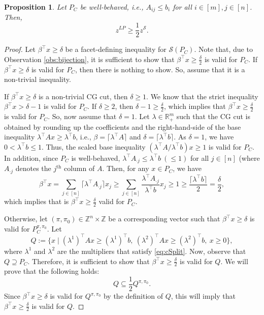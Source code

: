 \documentclass[11pt]{article}
\newcommand{\Z}{\mathbb{Z}}
\newcommand{\R}{\mathbb{R}}
\renewcommand{\S}{\mathcal{S}}
\newcommand{\ceil}[1]{\lceil#1\rceil}
\newcommand{\bpar}{\beta}
\newtheorem{proposition}{Proposition}
\newcommand{\cred}{\color{black}}
\begin{document}
\begin{proposition}
\label{prop:covering2approx}
Let $P_C$ be well-behaved, i.e., $A_{ij} \leq b_i$ for all $i \in [m], j \in [n]$. Then, 
$$z^{LP} \geq \frac{1}{2} z^{\S}.$$ 
\end{proposition}
\begin{proof}
Let $\bpar^\top x \geq \delta$ be a facet-defining inequality for $\S(P_C)$. Note that, due to Observation \ref{obs:bijection}, it is sufficient to show 
that $\bpar^\top x \geq \frac{\delta}{2}$ is valid for $P_C$. {\cred If $\bpar^\top x \geq \delta$ is valid for $P_C$, then there is nothing to show. So, assume that it is a non-trivial inequality.}

If $\bpar^\top x \geq \delta$ is a {\cred non-trivial} CG cut, then {\cred $\delta \geq 1$. We know that the strict inequality $\bpar^\top x > \delta - 1$ is valid for $P_C$. If $\delta \geq 2$, then $\delta - 1 \geq \frac{\delta}{2}$, which implies that  $\bpar^\top x \geq \frac{\delta}{2}$ is valid for $P_C$. So, now assume that $\delta = 1$. Let $\lambda \in \R_+^m$ such that the CG cut is obtained by rounding up the coefficients and the right-hand-side of the base inequality $\lambda^\top A x \geq \lambda^\top b$, i.e., $\beta = \ceil{\lambda^\top A}$ and $\delta = \ceil{\lambda^\top b}$. As $\delta = 1$, we have $0 < \lambda^\top b \leq 1$. Thus, the scaled base inequality $(\lambda^\top A / \lambda^\top b) x \geq 1$ is valid for $P_C$. In addition, since $P_C$ is well-behaved, $\lambda^\top A_{\cdot j} \leq \lambda^\top b \ (\leq 1)$ for all $j \in [n]$ (where $A_{\cdot j}$ denotes the $j^\text{th}$ column of $A$. Then, for any $x \in P_C$,  we have 
$$\beta^\top x = \sum_{j \in [n]} \ceil{\lambda^\top A_{\cdot j}} x_j \geq \sum_{j \in [n]} \frac{\lambda^\top A_{\cdot j}}{\lambda^\top b} x_j \geq 1 \geq \frac{\ceil{\lambda^\top b}}{2} = \frac{\delta}{2},$$
which implies that is $\beta^\top x \geq \frac{\delta}{2}$ valid for $P_C$.
}

Otherwise, let $(\pi,\pi_0) \in \Z^n \times \Z$ be a corresponding vector such that $\bpar^\top x \geq \delta$ is valid for $P_C^{\pi,\pi_0}$. 
 Let
$$Q := \{ x \mid (\lambda^1)^\top Ax \geq (\lambda^1)^\top b, ~ (\lambda^2)^\top Ax \geq (\lambda^2)^\top b,  ~ x \geq 0\},$$
where $\lambda^1$ and $\lambda^2$ are the multipliers that satisfy \eqref{eq:cSplit}. Now, observe that $Q \supseteq P_C$. Therefore, it is sufficient to show that $\bpar^\top x \geq \frac{\delta}{2}$ is valid for $Q$. We will prove that the following holds:
\begin{equation}
\label{eq:Qclaim}
Q \subseteq \frac{1}{2} Q^{\pi,\pi_0}.
\end{equation}
Since $\bpar^\top x \geq \delta$ is valid for $Q^{\pi,\pi_0}$ by the definition of $Q$, this will imply that  $\bpar^\top x \geq \frac{\delta}{2}$ is valid for $Q$.


\end{proof}
\end{document}
